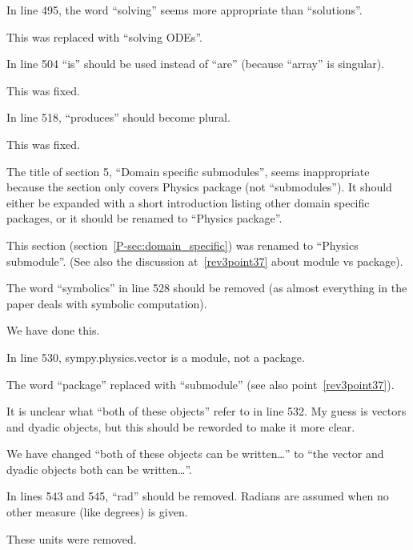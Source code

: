 \documentclass[answers,12pt]{exam}
\begin{document}
\begin{questions}
\question In line 495, the word ``solving'' seems more appropriate than ``solutions''.
\begin{solution}
This was replaced with ``solving ODEs''.
\end{solution}

\question In line 504 ``is'' should be used instead of ``are'' (because ``array'' is singular).
\begin{solution}
This was fixed.
\end{solution}

\question In line 518, ``produces'' should become plural.
\begin{solution}
This was fixed.
\end{solution}

\question The title of section 5, ``Domain specific submodules'', seems inappropriate because the section only covers Physics package (not ``submodules''). It should either be expanded with a short introduction listing other domain specific packages, or it should be renamed to ``Physics package''.
\begin{solution}
\label{rev3point30}
This section (section~\ref{P-sec:domain_specific}) was renamed to ``Physics submodule''.  (See also the
discussion at~\ref{rev3point37} about module vs package).
\end{solution}

\question The word ``symbolics'' in line 528 should be removed (as almost everything in the paper deals with symbolic computation).
\begin{solution}
We have done this.
\end{solution}

\question In line 530, sympy.physics.vector is a module, not a package.
\begin{solution}
The word ``package'' replaced with ``submodule'' (see also point~\ref{rev3point37}).
\end{solution}

\question It is unclear what ``both of these objects'' refer to in line 532. My guess is vectors and dyadic objects, but this should be reworded to make it more clear.
\begin{solution}
We have changed ``both of these objects can be written\ldots'' to ``the vector
and dyadic objects both can be written\ldots''.
\end{solution}

\question In lines 543 and 545, ``rad'' should be removed. Radians are assumed when no other measure (like degrees) is given.
\begin{solution}
These units were removed.
\end{solution}


\end{questions}
\end{document}
